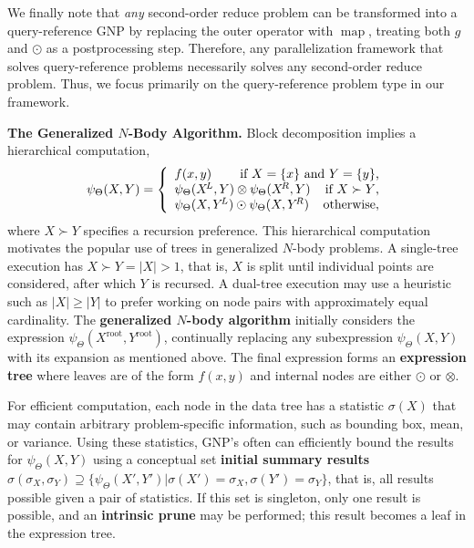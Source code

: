 \documentclass[times, leqno,twocolumn]{article}
\newcommand{\prefsplit}[2]{#1 \succ #2}
\newcommand{\summary}{\hat{\sigma}}
\DeclareMathOperator*{\map}{map}
\newcommand{\gnp}{\psi_{\Theta}}
\newcommand{\defterm}[1]{{\bf #1}}
\newcommand{\kdroot}[1]{#1^{\text{root}}}
\newcommand{\kdleft}[1]{#1^{\!L}}
\newcommand{\kdright}[1]{#1^{\!R}}
\newcommand{\outstat}{\sigma}
\begin{document}
We finally note that {\it any} second-order reduce problem can be transformed into a query-reference GNP by replacing the outer operator with $\map$, treating both $g$ and $\odot$ as a postprocessing step.
Therefore, any parallelization framework that solves query-reference problems necessarily solves any second-order reduce problem.
Thus, we focus primarily on the query-reference problem type in our framework.

{\bf The Generalized $N$-Body Algorithm.}
Block decomposition implies a hierarchical computation,
\[
\gnp(X,Y) = \left\{ \begin{array}{lrr}
    f(x,y) & \multicolumn{2}{r}{\text{if }X = \{x\}\text{ and }Y = \{y\}\text{,}}
    \\
    \multicolumn{2}{l}{\gnp(\kdleft{X},Y) \otimes \gnp(\kdright{X}, Y)} & \text{if }\prefsplit{X}{Y}\text{,}
    \\
    \multicolumn{2}{l}{\gnp(X,\kdleft{Y}) \odot \gnp(X,\kdright{Y})} & \text{otherwise,}
  \end{array}
\right.
\]
\noindent where $\prefsplit{X}{Y}$ specifies a recursion preference.
This hierarchical computation motivates the popular use of trees in generalized $N$-body problems.
A single-tree execution has $\prefsplit{X}{Y} = |X| > 1$, that is, $X$ is split until individual points are considered, after which $Y$ is recursed.
A dual-tree execution may use a heuristic such as $|X| \geq |Y|$ to prefer working on node pairs with approximately equal cardinality.
The \defterm{generalized $N$-body algorithm} initially considers the expression $\gnp(\kdroot{X}, \kdroot{Y})$, continually replacing any subexpression $\gnp(X, Y)$ with its expansion as mentioned above.
The final expression forms an \defterm{expression tree} where leaves are of the form $f(x,y)$ and internal nodes are either $\odot$ or $\otimes$.

For efficient computation, each node in the data tree has a statistic $\outstat(X)$ that may contain arbitrary problem-specific information, such as bounding box, mean, or variance.
Using these statistics, GNP's often can efficiently bound the results for $\gnp(X,Y)$ using a conceptual set \defterm{initial summary results} $\summary(\outstat_X,\outstat_Y) \supseteq \{\gnp(X',Y') | \outstat(X')\!\!=\!\!\outstat_X, \outstat(Y')\!\!=\!\!\outstat_Y\}$, that is, all results possible given a pair of statistics.
If this set is singleton, only one result is possible, and an \defterm{intrinsic prune} may be performed; this result becomes a leaf in the expression tree.
\end{document}
